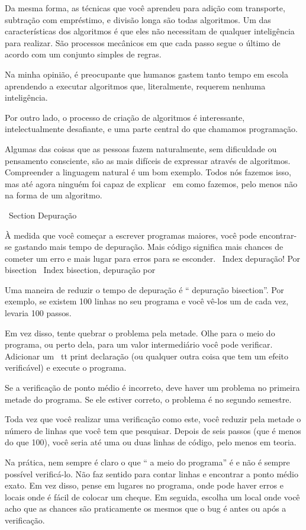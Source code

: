 \documentclass[10pt]{book}
\begin{document}
{{{{Da mesma forma, as técnicas que você aprendeu para adição com transporte,
subtração com empréstimo, e divisão longa são todas algoritmos. Um
das características dos algoritmos é que eles não necessitam de qualquer
inteligência para realizar. São processos mecânicos em que
cada passo segue o último de acordo com um conjunto simples de regras.

Na minha opinião, é preocupante que humanos gastem tanto tempo em
escola aprendendo a executar algoritmos que, literalmente, requerem
nenhuma inteligência.

Por outro lado, o processo de criação de algoritmos é interessante,
intelectualmente desafiante, e uma parte central do que chamamos
programação.

Algumas das coisas que as pessoas fazem naturalmente, sem dificuldade ou
pensamento consciente, são as mais difíceis de expressar através de algoritmos.
Compreender a linguagem natural é um bom exemplo. Todos nós fazemos isso, mas
até agora ninguém foi capaz de explicar {\ em como} fazemos, pelo menos
não na forma de um algoritmo.


\ Section {} Depuração

À medida que você começar a escrever programas maiores, você pode encontrar-se
gastando mais tempo de depuração. Mais código significa mais chances de
cometer um erro e mais lugar para erros para se esconder.
\ Index {depuração! Por bisection}
\ Index {bisection, depuração por}

Uma maneira de reduzir o tempo de depuração é `` depuração bisection''.
Por exemplo, se existem 100 linhas no seu programa e você
vê-los um de cada vez, levaria 100 passos.

Em vez disso, tente quebrar o problema pela metade. Olhe para o meio
do programa, ou perto dela, para um valor intermediário você
pode verificar. Adicionar um {\ tt print} declaração (ou qualquer outra coisa
que tem um efeito verificável) e execute o programa.

Se a verificação de ponto médio é incorreto, deve haver um problema no
primeira metade do programa. Se ele estiver correto, o problema é
no segundo semestre.

Toda vez que você realizar uma verificação como este, você reduzir pela metade o número de
linhas que você tem que pesquisar. Depois de seis passos (que é menos do que 100),
você seria até uma ou duas linhas de código, pelo menos em teoria.

Na prática, nem sempre é claro o que
`` a meio do programa'' é e não é sempre possível
verificá-lo. Não faz sentido para contar linhas e encontrar a
ponto médio exato. Em vez disso, pense em lugares
no programa, onde pode haver erros e locais onde
é fácil de colocar um cheque. Em seguida, escolha um local onde você
acho que as chances são praticamente os mesmos que o bug é antes
ou após a verificação.




}}}}
\end{document}
